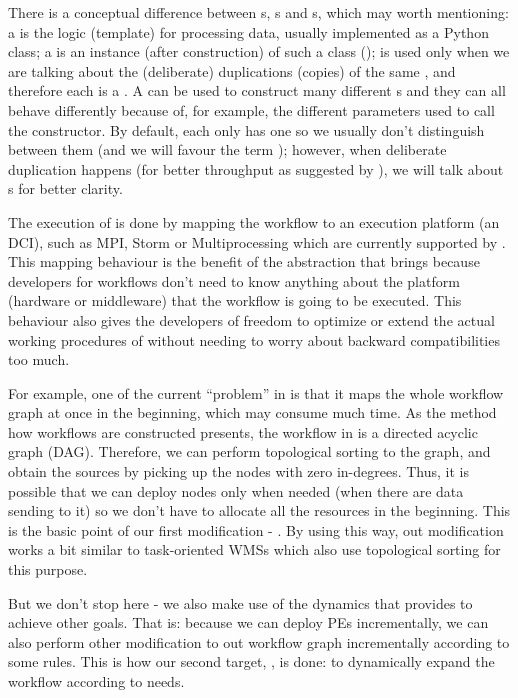 
There is a conceptual difference between \tPETmpl{}s, \tPEInst{}s and \tPEDup{}s, which may worth mentioning: a \tPETmpl is the logic (template) for processing data, usually implemented as a Python class; a \tPEInst is an instance (after construction) of such a class (\tPETmpl); \tPEDup is used only when we are talking about the (deliberate) duplications (copies) of the same \tPEInst, and therefore each \tPEDup is a \tPEInst. A \tPETmpl can be used to construct many different \tPEInst{}s and they can all behave differently because of, for example, the different parameters used to call the constructor. By default, each \tPEInst only has one \tPEDup so we usually don't distinguish between them (and we will favour the term \tPEInst); however, when deliberate duplication happens (\eg for better throughput as suggested by \citeauthor{doi:10.1177/1094342016649766} \cite{doi:10.1177/1094342016649766}), we will talk about \tPEDup{}s for better clarity.

The execution of \dpy is done by mapping the workflow to an execution platform (\ie an DCI), such as MPI, Storm or Multiprocessing which are currently supported by \dpy. This mapping behaviour is the benefit of the abstraction that \dpy brings because developers for workflows don't need to know anything about the platform (\eg hardware or middleware) that the workflow is going to be executed. This behaviour also gives the developers of \dpy freedom to optimize or extend the actual working procedures of \dpy without needing to worry about backward compatibilities too much.

For example, one of the current ``problem'' in \dpy is that it maps the whole workflow graph at once in the beginning, which may consume much time. As the method how workflows are constructed presents, the workflow in \dpy is a directed acyclic graph (DAG). Therefore, we can perform topological sorting to the graph, and obtain the sources by picking up the nodes with zero in-degrees. Thus, it is possible that we can deploy nodes only when needed (\eg when there are data sending to it) so we don't have to allocate all the resources in the beginning. This is the basic point of our first modification - \tincdep. By using this way, out modification works a bit similar to task-oriented WMSs which also use topological sorting for this purpose.

But we don't stop here - we also make use of the dynamics that \tincdep provides to achieve other goals. That is: because we can deploy PEs incrementally, we can also perform other modification to out workflow graph incrementally according to some rules. This is how our second target, \tdynexp, is done: to dynamically expand the workflow according to needs.

